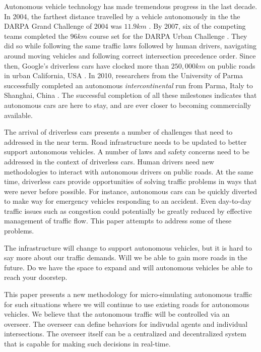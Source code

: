 \documentclass[letterpaper, 10 pt, conference]{ieeeconf}  %
\begin{document}
Autonomous vehicle technology has made tremendous progress in the last decade. In 2004, the farthest distance travelled by a vehicle autonomously in the the DARPA Grand Challenge of 2004 was $11.9km$ \cite{cnnGrandChallenge2004}. By 2007, six of the competing teams completed the $96km$ course set for the DARPA Urban Challenge \cite{spectrumUrbanChallenge2007}. They did so while following the same traffic laws followed by human drivers, navigating around moving vehicles and following correct intersection precedence order. Since then, Google's driverless cars have clocked more than $250,000km$ on public roads in urban California, USA \cite{tedThrun2011}. In 2010, researchers from the University of Parma successfully completed an autonomous \textit{intercontinental} run from Parma, Italy to Shanghai, China \cite{cnnVislab2010}. The successful completion of all these milestones indicates that autonomous cars are here to stay, and are ever closer to becoming commercially available. 

The arrival of driverless cars presents a number of challenges that need to addressed in the near term. Road infrastructure needs to be updated to better support autonomous vehicles. A number of laws and safety concerns need to be addressed in the context of driverless cars. Human drivers need new methodologies to interact with autonomous drivers on public roads. At the same time, driverless cars provide opportunities of solving traffic problems in ways that were never before possible. For instance, autonomous cars can be quickly diverted to make way for emergency vehicles responding to an accident. Even day-to-day traffic issues such as congestion could potentially be greatly reduced by effective management of traffic flow. This paper attempts to address some of these problems.

The infrastructure will change to support autonomous vehicles, but it is hard to say more about our traffic demands. Will we be able to gain more roads in the future. Do we have the space to expand and will autonomous vehicles be able to reach your doorstep.

This paper presents a new methodology for micro-simulating autonomous traffic for such situations where we will continue to use existing roads for autonomous vehicles. We believe that the autonomous traffic will be controlled via an overseer. The overseer can define behaviors for indivudal agents and individual intersections. The overseer itself can be a centralized and decentralized system that is capable for making such decisions in real-time.
\end{document}
